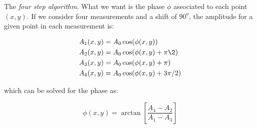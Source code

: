 \documentclass{article}
\begin{document}
The \emph{four step algorithm}.
What we want is the phase $\phi$ associated to each point $(x,y)$. If we consider four measurements and a shift of $90^o$, the amplitude for a given point in each measurement is:

\begin{align}
A_1(x,y)&=A_0\cos(\phi(x,y)) \\
A_2(x,y)&=A_0\cos(\phi(x,y)+\pi\2) \nonumber\\
A_3(x,y)&=A_0\cos(\phi(x,y)+\pi) \nonumber\\
A_4(x,y)&=A_0\cos(\phi(x,y)+3\pi/2) \nonumber
\end{align}

\noindent which can be solved for the phase as:

\begin{equation}
\phi(x,y)=\arctan\left[\frac{A_4-A_2}{A_1-A_3}\right]
\end{equation}
\end{document}
